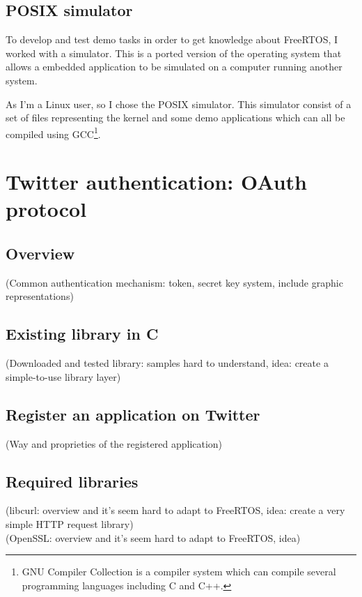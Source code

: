 \subsection{POSIX simulator}

\hspace{15mm}To develop and test demo tasks in order to get knowledge about FreeRTOS, I worked with a simulator. This is a ported version of the operating system that allows a embedded application to be simulated on a computer running another system.

As I'm a Linux user, so I chose the POSIX simulator. This simulator consist of a set of files representing the kernel and some demo applications which can all be compiled using GCC\footnote{GNU Compiler Collection is a compiler system which can compile several programming languages including C and C++.}.




\section{Twitter authentication: OAuth protocol}

\subsection{Overview}

(Common authentication mechanism: token, secret key system, include graphic representations)


\subsection{Existing library in C}

(Downloaded and tested library: samples hard to understand, idea: create a simple-to-use library layer)


\subsection{Register an application on Twitter}

(Way and proprieties of the registered application)


\subsection{Required libraries}

(libcurl: overview and it's seem hard to adapt to FreeRTOS, idea: create a very simple HTTP request library)\\
(OpenSSL: overview and it's seem hard to adapt to FreeRTOS, idea)



\clearpage